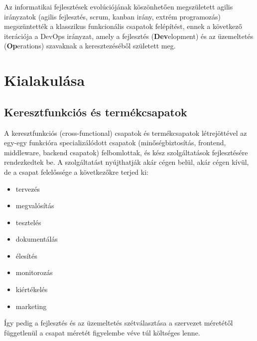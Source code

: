 
Az informatikai fejlesztések evolúciójának köszönhetően megszületett agilis irányzatok (agilis fejlesztés, scrum, kanban irány, extrém programozás) megszüntették a klasszikus funkcionális csapatok felépítést, ennek a következő iterációja a DevOps irányzat, amely a fejlesztés (\textbf{Dev}elopment) és az üzemeltetés (\textbf{Op}erations) szavaknak a keresztezéséből született meg.

\section[A DevOps munkakör kialakulása]{Kialakulása}

\subsection*{Keresztfunkciós és termékcsapatok}
A keresztfunkciós (cross-functional) csapatok és termékcsapatok létrejöttével az egy-egy funkcióra specializálódott csapatok (minőségbiztosítás, frontend, middleware, backend csapatok) felbomlottak, és kész szolgáltatások fejlesztésére rendezkedtek be. A szolgáltatást nyújthatják akár cégen belül, akár cégen kívül, de a csapat felelőssége a következőkre terjed ki:
\begin{itemize}
  \item tervezés
  \item megvalósítás
  \item tesztelés
  \item dokumentálás
  \item élesítés
  \item monitorozás
  \item kiértékelés
  \item marketing
\end{itemize}
Így pedig a fejlesztés és az üzemeltetés szétválasztása a szervezet méretétől függetlenül a csapat méretét figyelembe véve túl költséges lenne.

